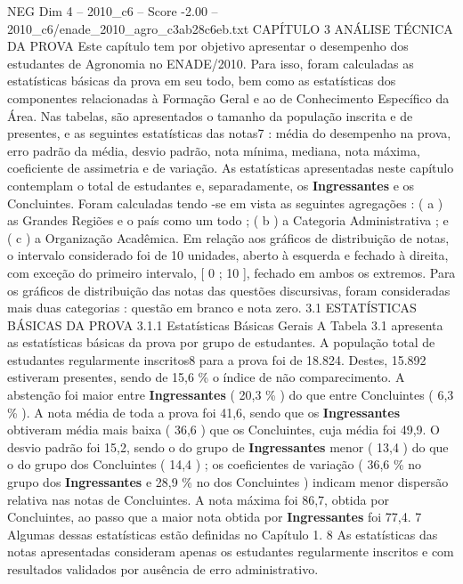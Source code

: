 \begin{textsample}{NEG Dim 4 – 2010\_c6 – Score -2.00 – 2010\_c6/enade\_2010\_agro\_c3ab28c6eb.txt}  \label{ex:f4_neg_043}
CAPÍTULO 3 ANÁLISE TÉCNICA DA PROVA Este capítulo tem por objetivo apresentar o desempenho dos estudantes de Agronomia no ENADE/2010.
Para isso, foram calculadas as estatísticas básicas da prova em seu todo, bem como as estatísticas dos componentes relacionadas à Formação Geral e ao de Conhecimento Específico da Área.
Nas tabelas, são apresentados o tamanho da população inscrita e de presentes, e as seguintes estatísticas das notas7 : média do desempenho na prova, erro padrão da média, desvio padrão, nota mínima, mediana, nota máxima, coeficiente de assimetria e de variação.
As estatísticas apresentadas neste capítulo contemplam o total de estudantes e, separadamente, os \textbf{Ingressantes} e os Concluintes.
Foram calculadas tendo -se em vista as seguintes agregações : ( a ) as Grandes Regiões e o país como um todo ; ( b ) a Categoria Administrativa ; e ( c ) a Organização Acadêmica.
Em relação aos gráficos de distribuição de notas, o intervalo considerado foi de 10 unidades, aberto à esquerda e fechado à direita, com exceção do primeiro intervalo, [ 0 ; 10 ], fechado em ambos os extremos.
Para os gráficos de distribuição das notas das questões discursivas, foram consideradas mais duas categorias : questão em branco e nota zero. 3.1 ESTATÍSTICAS BÁSICAS DA PROVA 3.1.1 Estatísticas Básicas Gerais A Tabela 3.1 apresenta as estatísticas básicas da prova por grupo de estudantes.
A população total de estudantes regularmente inscritos8 para a prova foi de 18.824.
Destes, 15.892 estiveram presentes, sendo de 15,6 \% o índice de não comparecimento.
A abstenção foi maior entre \textbf{Ingressantes} ( 20,3 \% ) do que entre Concluintes ( 6,3 \% ).
A nota média de toda a prova foi 41,6, sendo que os \textbf{Ingressantes} obtiveram média mais baixa ( 36,6 ) que os Concluintes, cuja média foi 49,9.
O desvio padrão foi 15,2, sendo o do grupo de \textbf{Ingressantes} menor ( 13,4 ) do que o do grupo dos Concluintes ( 14,4 ) ; os coeficientes de variação ( 36,6 \% no grupo dos \textbf{Ingressantes} e 28,9 \% no dos Concluintes ) indicam menor dispersão relativa nas notas de Concluintes.
A nota máxima foi 86,7, obtida por Concluintes, ao passo que a maior nota obtida por \textbf{Ingressantes} foi 77,4. 7 Algumas dessas estatísticas estão definidas no Capítulo 1. 8 As estatísticas das notas apresentadas consideram apenas os estudantes regularmente inscritos e com resultados validados por ausência de erro administrativo.

\end{textsample}
